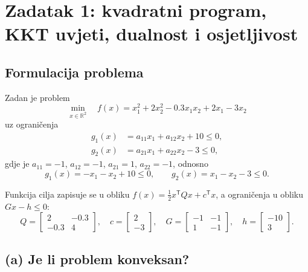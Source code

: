 \section{Zadatak 1: kvadratni program, KKT uvjeti, dualnost i osjetljivost}

\subsection{Formulacija problema}

Zadan je problem
\begin{equation}
\min_{x \in \mathbb{R}^2} \quad f(x) = x_1^2 + 2x_2^2 - 0.3 x_1 x_2 + 2x_1 - 3x_2
\label{eq:qp_cilj}
\end{equation}
uz ograničenja
\begin{align}
g_1(x) &= a_{11} x_1 + a_{12} x_2 + 10 \leq 0, \label{eq:qp_g1} \\
g_2(x) &= a_{21} x_1 + a_{22} x_2 - 3 \leq 0, \label{eq:qp_g2}
\end{align}
gdje je $a_{11} = -1$, $a_{12} = -1$, $a_{21} = 1$, $a_{22} = -1$, odnosno
\begin{equation}
g_1(x) = -x_1 - x_2 + 10 \leq 0, \qquad g_2(x) = x_1 - x_2 - 3 \leq 0.
\end{equation}

Funkcija cilja zapisuje se u obliku $f(x) = \tfrac{1}{2} x^{\mathsf{T}} Q x + c^{\mathsf{T}} x$, a ograničenja u obliku $Gx - h \leq 0$:
\begin{equation}
Q = \begin{bmatrix} 2 & -0.3 \\ -0.3 & 4 \end{bmatrix}, \quad
c = \begin{bmatrix} 2 \\ -3 \end{bmatrix}, \quad
G = \begin{bmatrix} -1 & -1 \\ 1 & -1 \end{bmatrix}, \quad
h = \begin{bmatrix} -10 \\ 3 \end{bmatrix}.
\label{eq:qp_matrice}
\end{equation}

\subsection{(a) Je li problem konveksan?}

